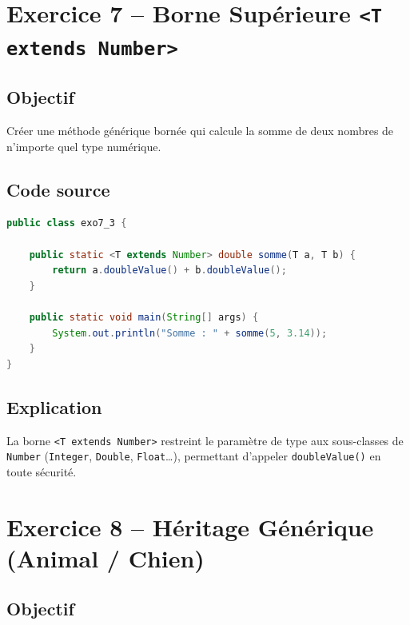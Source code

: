 \section{Exercice 7 -- Borne Supérieure \texttt{<T extends Number>}}

\subsection{Objectif}

Créer une méthode générique bornée qui calcule la somme de deux nombres
de n'importe quel type numérique.

\subsection{Code source}

\begin{lstlisting}[language=Java, caption={exo7\_3.java -- Borne supérieure}]
public class exo7_3 {

    public static <T extends Number> double somme(T a, T b) {
        return a.doubleValue() + b.doubleValue();
    }

    public static void main(String[] args) {
        System.out.println("Somme : " + somme(5, 3.14));
    }
}
\end{lstlisting}

\subsection{Explication}

\begin{accentbox}
    \centering\vspace{0.3cm}
    {\large La borne \texttt{<T extends Number>} restreint le paramètre
    de type aux sous-classes de \texttt{Number} (\texttt{Integer},
    \texttt{Double}, \texttt{Float}\ldots), permettant d'appeler
    \texttt{doubleValue()} en toute sécurité.}
    \vspace{0.3cm}
\end{accentbox}

\section{Exercice 8 -- Héritage Générique (Animal / Chien)}

\subsection{Objectif}

